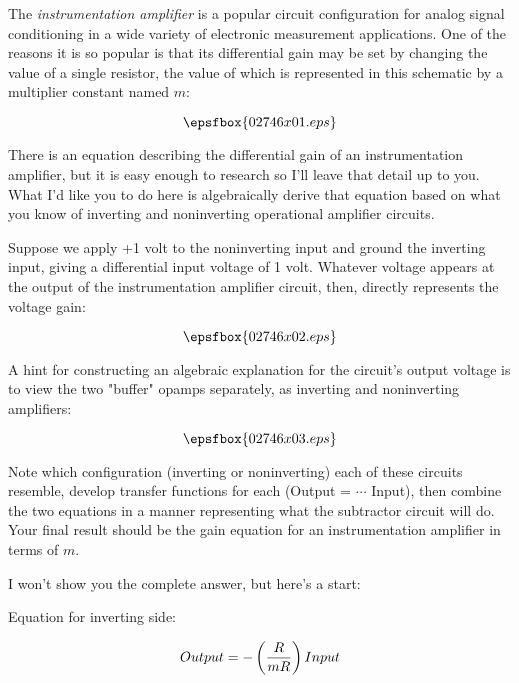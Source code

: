 

The {\it instrumentation amplifier} is a popular circuit configuration for analog signal conditioning in a wide variety of electronic measurement applications.  One of the reasons it is so popular is that its differential gain may be set by changing the value of a single resistor, the value of which is represented in this schematic by a multiplier constant named $m$:

$$\epsfbox{02746x01.eps}$$

There is an equation describing the differential gain of an instrumentation amplifier, but it is easy enough to research so I'll leave that detail up to you.  What I'd like you to do here is algebraically derive that equation based on what you know of inverting and noninverting operational amplifier circuits.

Suppose we apply +1 volt to the noninverting input and ground the inverting input, giving a differential input voltage of 1 volt.  Whatever voltage appears at the output of the instrumentation amplifier circuit, then, directly represents the voltage gain:

$$\epsfbox{02746x02.eps}$$

A hint for constructing an algebraic explanation for the circuit's output voltage is to view the two "buffer" opamps separately, as inverting and noninverting amplifiers:

$$\epsfbox{02746x03.eps}$$

Note which configuration (inverting or noninverting) each of these circuits resemble, develop transfer functions for each (Output = $\cdots$ Input), then combine the two equations in a manner representing what the subtractor circuit will do.  Your final result should be the gain equation for an instrumentation amplifier in terms of $m$.







I won't show you the complete answer, but here's a start:

\vskip 10pt

\noindent
Equation for inverting side:

$$Output = - \left( {R \over mR} \right) Input$$

